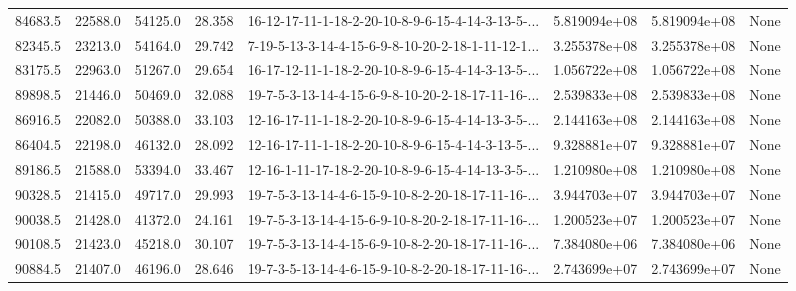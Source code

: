 \begin{tabular}{rrrrlrrl}
 84683.5 &  22588.0 &        54125.0 &             28.358 &  16-12-17-11-1-18-2-20-10-8-9-6-15-4-14-3-13-5-... &  5.819094e+08 &  5.819094e+08 &   None \\
 82345.5 &  23213.0 &        54164.0 &             29.742 &  7-19-5-13-3-14-4-15-6-9-8-10-20-2-18-1-11-12-1... &  3.255378e+08 &  3.255378e+08 &   None \\
 83175.5 &  22963.0 &        51267.0 &             29.654 &  16-17-12-11-1-18-2-20-10-8-9-6-15-4-14-3-13-5-... &  1.056722e+08 &  1.056722e+08 &   None \\
 89898.5 &  21446.0 &        50469.0 &             32.088 &  19-7-5-3-13-14-4-15-6-9-8-10-20-2-18-17-11-16-... &  2.539833e+08 &  2.539833e+08 &   None \\
 86916.5 &  22082.0 &        50388.0 &             33.103 &  12-16-17-11-1-18-2-20-10-8-9-6-15-4-14-13-3-5-... &  2.144163e+08 &  2.144163e+08 &   None \\
 86404.5 &  22198.0 &        46132.0 &             28.092 &  12-16-17-11-1-18-2-20-10-8-9-6-15-4-14-3-13-5-... &  9.328881e+07 &  9.328881e+07 &   None \\
 89186.5 &  21588.0 &        53394.0 &             33.467 &  12-16-1-11-17-18-2-20-10-8-9-6-15-4-14-13-3-5-... &  1.210980e+08 &  1.210980e+08 &   None \\
 90328.5 &  21415.0 &        49717.0 &             29.993 &  19-7-5-3-13-14-4-6-15-9-10-8-2-20-18-17-11-16-... &  3.944703e+07 &  3.944703e+07 &   None \\
 90038.5 &  21428.0 &        41372.0 &             24.161 &  19-7-5-3-13-14-4-15-6-9-10-8-20-2-18-17-11-16-... &  1.200523e+07 &  1.200523e+07 &   None \\
 90108.5 &  21423.0 &        45218.0 &             30.107 &  19-7-5-3-13-14-4-15-6-9-10-8-2-20-18-17-11-16-... &  7.384080e+06 &  7.384080e+06 &   None \\
 90884.5 &  21407.0 &        46196.0 &             28.646 &  19-7-3-5-13-14-4-6-15-9-10-8-2-20-18-17-11-16-... &  2.743699e+07 &  2.743699e+07 &   None \\
\bottomrule
\end{tabular}
